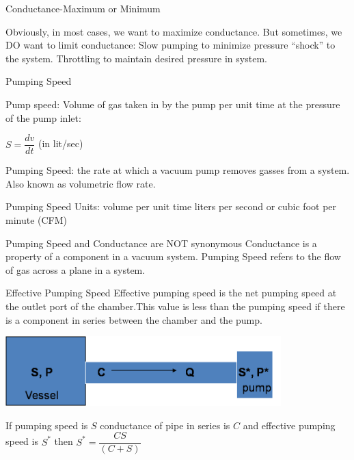\documentclass[11]{beamer}
\begin{document}
\begin{frame}{Conductance-Maximum or Minimum}

Obviously, in most cases, we want to maximize conductance.
But sometimes, we DO want to limit conductance:
Slow pumping to minimize pressure “shock” to the system.
Throttling to maintain desired pressure in system.



\end{frame}

\begin{frame}{Pumping Speed}

Pump speed: Volume of gas taken in by the pump per unit time at the pressure of the pump inlet:

                      \begin{center}
                      $ S = \dfrac{dv}{dt} $ (in lit/sec)
                      \end{center}                              
                                


Pumping Speed:  the rate at which a vacuum pump removes gasses from a system. Also known as volumetric flow rate.


Pumping Speed Units:  volume per unit time  liters per second or cubic foot per minute (CFM)

Pumping Speed and Conductance are NOT synonymous
Conductance is a property of  a component in a vacuum system.
Pumping Speed refers to the flow of gas across a plane in a system.



\end{frame}


\begin{frame}{Effective Pumping Speed}
Effective pumping speed is the net pumping speed at the outlet port of the chamber.This value is less than the pumping speed if there is a component in series between the chamber and the pump.


   \begin{center}
		
		\includegraphics[width=0.8\textwidth]{EffectivePumpingSpeed.png}
		
	\end{center}

If pumping speed is $S$ conductance of pipe in series is $ C $ and effective pumping speed is $ S^{*}$ then $ S^{*}=\dfrac{CS}{(C+S)}$



\end{frame}
\end{document}

